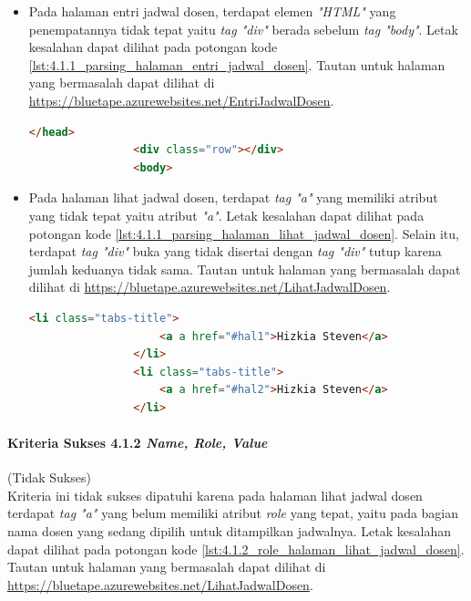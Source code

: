 \documentclass[a4paper,twoside]{article}
\begin{document}
\begin{enumerate}
\begin{itemize}
			\item Pada halaman entri jadwal dosen, terdapat elemen \textit{"HTML"} yang penempatannya tidak tepat yaitu \textit{tag "div"} berada sebelum \textit{tag "body"}. Letak kesalahan dapat dilihat pada potongan kode \ref{lst:4.1.1_parsing_halaman_entri_jadwal_dosen}. Tautan untuk halaman yang bermasalah dapat dilihat di \url{https://bluetape.azurewebsites.net/EntriJadwalDosen}.
			\begin{lstlisting}[frame=single, label={lst:4.1.1_parsing_halaman_entri_jadwal_dosen}, language=HTML, caption=Kriteria Sukses 4.1.1 - Kesalahan Elemen pada Halaman Entri Jadwal Dosen]
				</head>
				<div class="row"></div>        
				<body>
			\end{lstlisting}
			
			\item Pada halaman lihat jadwal dosen, terdapat \textit{tag "a"} yang memiliki atribut yang tidak tepat yaitu atribut \textit{"a"}. Letak kesalahan dapat dilihat pada potongan kode \ref{lst:4.1.1_parsing_halaman_lihat_jadwal_dosen}. Selain itu, terdapat \textit{tag "div"} buka yang tidak disertai dengan \textit{tag "div"} tutup karena jumlah keduanya tidak sama. Tautan untuk halaman yang bermasalah dapat dilihat di \url{https://bluetape.azurewebsites.net/LihatJadwalDosen}.
			\begin{lstlisting}[frame=single, label={lst:4.1.1_parsing_halaman_lihat_jadwal_dosen}, language=HTML, caption=Kriteria Sukses 4.1.1 - Kesalahan Elemen pada Halaman Lihat Jadwal Dosen]
				<li class="tabs-title">
					<a a href="#hal1">Hizkia Steven</a>
				</li>
				<li class="tabs-title">
					<a a href="#hal2">Hizkia Steven</a>
				</li>
			\end{lstlisting}
		\end{itemize}

		\paragraph{Kriteria Sukses 4.1.2 \textit{Name, Role, Value}}
		\label{par:kepatuhan_bluetape_kriteria_sukses_4.1.2}
		(Tidak Sukses)\\

		Kriteria ini tidak sukses dipatuhi karena pada halaman lihat jadwal dosen terdapat \textit{tag "a"} yang belum memiliki atribut \textit{role} yang tepat, yaitu pada bagian nama dosen yang sedang dipilih untuk ditampilkan jadwalnya. Letak kesalahan dapat dilihat pada potongan kode \ref{lst:4.1.2_role_halaman_lihat_jadwal_dosen}. Tautan untuk halaman yang bermasalah dapat dilihat di \url{https://bluetape.azurewebsites.net/LihatJadwalDosen}.


\end{enumerate}
\end{document}
